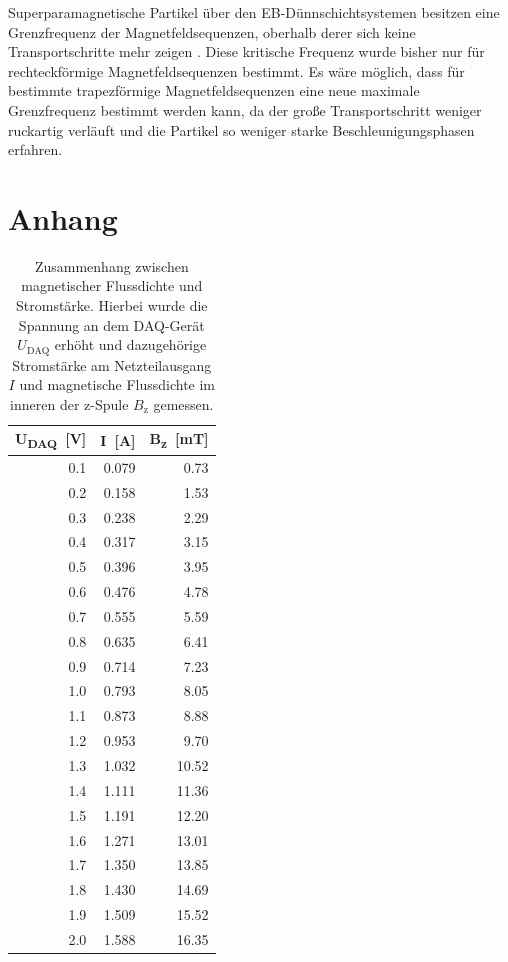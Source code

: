 \documentclass[page,pdftex,12pt,a4paper,twoside,openright]{scrbook}
\begin{document}
Superparamagnetische Partikel über den EB-Dünnschichtsystemen besitzen eine Grenzfrequenz der Magnetfeldsequenzen, oberhalb derer sich keine Transportschritte mehr zeigen \cite{holzinger_directed_2015}. Diese kritische Frequenz wurde bisher nur für rechteckförmige Magnetfeldsequenzen bestimmt. Es wäre möglich, dass für bestimmte trapezförmige Magnetfeldsequenzen eine neue maximale Grenzfrequenz bestimmt werden kann, da der große Transportschritt weniger ruckartig verläuft und die Partikel so weniger starke Beschleunigungsphasen erfahren.\\

\chapter{Anhang}
\label{sec:org85b76d5}

\begin{table}[htbp]
\caption{\label{tab-B}
Zusammenhang zwischen magnetischer Flussdichte und Stromstärke. Hierbei wurde die Spannung an dem DAQ-Gerät \(U_\mathrm{DAQ}\) erhöht und dazugehörige Stromstärke am Netzteilausgang \(I\) und magnetische Flussdichte im inneren der z-Spule \(B_\mathrm{z}\) gemessen.}
\centering
\begin{tabular}{r|r|r}
U\textsubscript{DAQ}~[\si{\volt}] & I~[\si{\ampere}] & B\textsubscript{z}~[\si{\milli\tesla}]\\
\hline
0.1 & 0.079 & 0.73\\
0.2 & 0.158 & 1.53\\
0.3 & 0.238 & 2.29\\
0.4 & 0.317 & 3.15\\
0.5 & 0.396 & 3.95\\
0.6 & 0.476 & 4.78\\
0.7 & 0.555 & 5.59\\
0.8 & 0.635 & 6.41\\
0.9 & 0.714 & 7.23\\
1.0 & 0.793 & 8.05\\
1.1 & 0.873 & 8.88\\
1.2 & 0.953 & 9.70\\
1.3 & 1.032 & 10.52\\
1.4 & 1.111 & 11.36\\
1.5 & 1.191 & 12.20\\
1.6 & 1.271 & 13.01\\
1.7 & 1.350 & 13.85\\
1.8 & 1.430 & 14.69\\
1.9 & 1.509 & 15.52\\
2.0 & 1.588 & 16.35\\
\end{tabular}
\end{table}
\end{document}
